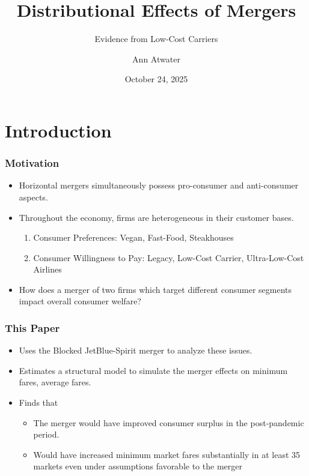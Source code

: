 \documentclass[xcolor=dvipsnames]{beamer}
\author{Ann Atwater}
\institute{University of Florida}
\title{Distributional Effects of Mergers}
\subtitle{Evidence from Low-Cost Carriers}
\date{October 24, 2025}
\begin{document}
	\section{Introduction}
	\frame{\titlepage}
    \begin{frame}
        \frametitle{Motivation}
        \begin{itemize}
        \item Horizontal mergers simultaneously possess pro-consumer and anti-consumer aspects.
        \item Throughout the economy, firms are heterogeneous in their customer bases.
            \begin{enumerate}
                \item Consumer Preferences: Vegan, Fast-Food, Steakhouses 
                \item Consumer Willingness to Pay: Legacy, Low-Cost Carrier, Ultra-Low-Cost Airlines
            \end{enumerate}
        \item How does a merger of two firms which target different consumer segments impact overall consumer welfare?
        \end{itemize}
    \end{frame}

    \begin{frame}
        \frametitle{This Paper}
        \begin{itemize}
            \item Uses the Blocked JetBlue-Spirit merger to analyze these issues.
            \item Estimates a structural model to simulate the merger effects on minimum fares, average fares.
            \item Finds that 
            \begin{itemize}
                \item The merger would have improved consumer surplus in the post-pandemic period.
                \item Would have increased minimum market fares substantially in at least 35 markets even under assumptions favorable to the merger
            \end{itemize}
        \end{itemize}
    \end{frame}
\end{document}
